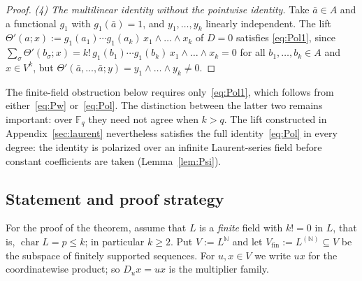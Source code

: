 \documentclass[11pt]{amsart}
\theoremstyle{definition}
\theoremstyle{remark}
\numberwithin{equation}{section}
\newcommand{\N}{\mathbb N}
\newcommand{\F}{\mathbb F}
\begin{document}
\begin{proof}
\emph{(4) The multilinear identity without the pointwise identity.} Take $\bar a\in A$ and a functional $g_1$ with $g_1(\bar a)=1$, and $y_1,\dots,y_k$ linearly independent. The
lift $\Theta'(a;x):=g_1(a_1)\cdots g_1(a_k)\,x_1\wedge\dots\wedge x_k$ of $D=0$ satisfies \eqref{eq:Pol1}, since
$\sum_\sigma\Theta'(b_\sigma;x)=k!\,g_1(b_1)\cdots g_1(b_k)\,x_1\wedge\dots\wedge x_k=0$ for all
$b_1,\dots,b_k\in A$ and $x\in V^k$, but $\Theta'(\bar a,\dots,\bar a;y)=y_1\wedge\dots\wedge y_k\neq0$.
\end{proof}

The finite-field obstruction below requires only~\eqref{eq:Pol1}, which follows from either~\eqref{eq:Pw}
or~\eqref{eq:Pol}. The distinction between the latter two remains important: over $\F_q$ they need not agree when
$k>q$. The lift constructed in Appendix~\ref{sec:laurent} nevertheless satisfies the full identity~\eqref{eq:Pol} in every
degree: the identity is polarized over an infinite Laurent-series field before constant coefficients are taken
(Lemma~\ref{lem:Psi}).

\subsection{Statement and proof strategy}
For the proof of the theorem, assume that $L$ is a \emph{finite} field with $k!=0$ in $L$, that is, $\operatorname{char}L=p\le k$; in
particular $k\ge2$. Put $V:=L^\N$ and let $V_{\mathrm{fin}}:=L^{(\N)}\subseteq V$ be the subspace of finitely supported
sequences. For $u,x\in V$ we write $ux$ for the coordinatewise product; so $D_ux=ux$ is the multiplier family.
\end{document}
